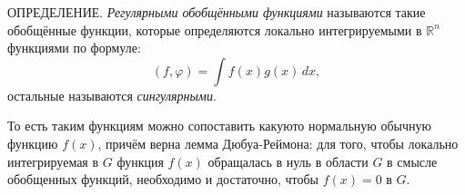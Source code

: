 ОПРЕДЕЛЕНИЕ. \emph{Регулярными обобщёнными функциями} называются такие обобщённые функции, которые
определяются локально интегрируемыми в $\mathbb{R}^n$ функциями по формуле:
\[
  (f, \varphi) = \int f(x) g(x) \, dx,
\]
остальные называются \emph{сингулярными}.

То есть таким функциям можно сопоставить какуюто нормальную обычную функцию $f(x)$, причём верна
лемма Дюбуа-Реймона: для того, чтобы локально интегрируемая в $G$ функция $f(x)$ обращалась в нуль
в области $G$ в смысле обобщенных функций, необходимо и достаточно, чтобы $f(x) = 0$ в $G$.



